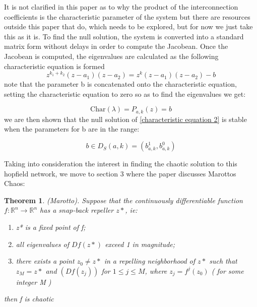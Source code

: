 \documentclass[12pt, letterpaper]{article}
\newtheorem{theorem}{Theorem}
\begin{document}
It is not clarified in this paper as to why the product of the interconnection coefficients is the characteristic parameter of the system but there are resources outside this paper that do, which needs to be explored, but for now we just take this as it is. To find the null solution, the system is converted into a standard matrix form without delays in order to compute the Jacobean. Once the Jacobean is computed, the eigenvalues are calculated as the following characteristic equation is formed
\begin{equation}\label{characteristic equation 1}
z^{k_{1} + k_{2}}(z - a_{1})(z - a_{2})  = z^{k}(z - a_{1})(z - a_{2}) - b
\end{equation}
note that the parameter b is concatenated onto the characteristic equation, setting the characteristic equation to zero so as to find the eigenvalues we get:

\begin{equation}\label{characteristic equation 2}
    \text{Char}(\lambda) = P_{a,k}(z) = b
\end{equation}
we are then shown that the null solution of \ref{characteristic equation 2} is stable when the parameters for b are in the range:

\begin{equation}\label{Null Solution Stability}
    b \in D_{S}(a,k) = (b_{a,k}^{1}, b_{a,k}^{0})
\end{equation}

Taking into consideration the interest in finding the chaotic solution to this hopfield network, we move to section 3 where the paper discusses Marottos Chaos:

\begin{theorem}(Marotto). Suppose that the continuously differentiable function \(f:\mathbb{R}^{n} \rightarrow \mathbb{R}^{n}\) has a snap-back repeller \(z*\), ie:
\begin{enumerate}
    \item z* is a fixed point of f;
    \item all eigenvalues of \(Df(z*)\) exceed 1 in magnitude;
    \item there exists a point \(z_{0} \neq z*\) in a repelling neighborhood of \(z*\) such that \(z_M = z*\) and \((Df(z_{j}))\) for \(1 \leq j \leq M\), where \(z_{j} = f^{j}(z_{0})\) ( for some integer M )\\
\end{enumerate}
then f is chaotic
\end{theorem}
\end{document}
